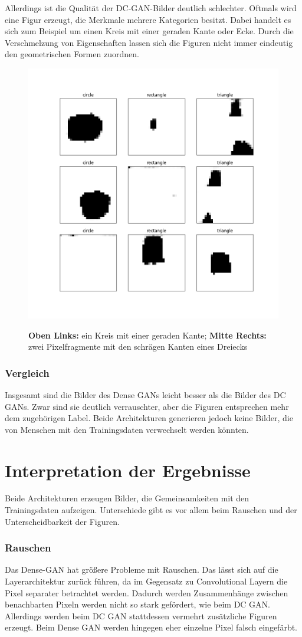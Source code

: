 Allerdings ist die Qualität der DC-GAN-Bilder deutlich schlechter.
Oftmals wird eine Figur erzeugt, die Merkmale mehrere Kategorien besitzt.
Dabei handelt es sich zum Beispiel um einen Kreis mit einer geraden Kante oder Ecke.
Durch die Verschmelzung von Eigenschaften lassen sich die Figuren nicht immer eindeutig den geometrischen Formen zuordnen.

\begin{figure}[H]
	\centering
	\includegraphics[width=0.45\linewidth]{kapitel/5_ergebnisse/dcgan/fid_circle.png}
	\label{ergebnis:dcgan-fid-zusammenfassung}
	\caption[]{\textbf{Oben Links:} ein Kreis mit einer geraden Kante; \textbf{Mitte Rechts:} zwei Pixelfragmente mit den schrägen Kanten eines Dreiecks}
\end{figure}

\subsubsection{Vergleich}
Insgesamt sind die Bilder des Dense GANs leicht besser als die Bilder des DC GANs.
Zwar sind sie deutlich verrauschter, aber die Figuren entsprechen mehr dem zugehörigen Label.
Beide Architekturen generieren jedoch keine Bilder, die von Menschen mit den Trainingsdaten verwechselt werden könnten.


\section{Interpretation der Ergebnisse}
Beide Architekturen erzeugen Bilder, die Gemeinsamkeiten mit den Trainingsdaten aufzeigen.
Unterschiede gibt es vor allem beim Rauschen und der Unterscheidbarkeit der Figuren.

\subsubsection{Rauschen}
Das Dense-GAN hat größere Probleme mit Rauschen.
Das lässt sich auf die Layerarchitektur zurück führen, da im Gegensatz zu Convolutional Layern die Pixel separater betrachtet werden.
Dadurch werden Zusammenhänge zwischen benachbarten Pixeln werden nicht so stark gefördert, wie beim DC GAN.
Allerdings werden beim DC GAN stattdessen vermehrt zusätzliche Figuren erzeugt.
Beim Dense GAN werden hingegen eher einzelne Pixel falsch eingefärbt.

